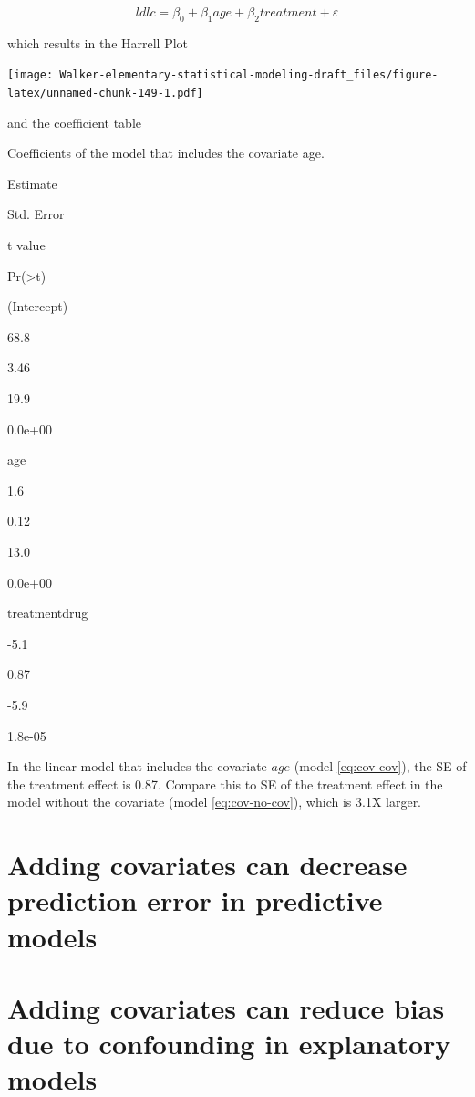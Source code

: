 \documentclass[]{book}
\begin{document}
\begin{equation}
ldlc = \beta_0 + \beta_1 age + \beta_2 treatment + \varepsilon
\label{eq:cov-cov}
\end{equation}

which results in the Harrell Plot

\texttt{[image: Walker-elementary-statistical-modeling-draft\_files/figure-latex/unnamed-chunk-149-1.pdf]}

and the coefficient table

\label{tab:unnamed-chunk-150}Coefficients of the model that includes the covariate age.

Estimate

Std. Error

t value

Pr(\textgreater\textbar t\textbar)

(Intercept)

68.8

3.46

19.9

0.0e+00

age

1.6

0.12

13.0

0.0e+00

treatmentdrug

-5.1

0.87

-5.9

1.8e-05

In the linear model that includes the covariate \(age\) (model \eqref{eq:cov-cov}), the SE of the treatment effect is 0.87. Compare this to SE of the treatment effect in the model without the covariate (model \eqref{eq:cov-no-cov}), which is 3.1X larger.

\hypertarget{adding-covariates-can-decrease-prediction-error-in-predictive-models}{%
\section{Adding covariates can decrease prediction error in predictive models}\label{adding-covariates-can-decrease-prediction-error-in-predictive-models}}

\hypertarget{adding-covariates-can-reduce-bias-due-to-confounding-in-explanatory-models}{%
\section{Adding covariates can reduce bias due to confounding in explanatory models}\label{adding-covariates-can-reduce-bias-due-to-confounding-in-explanatory-models}}
\end{document}
